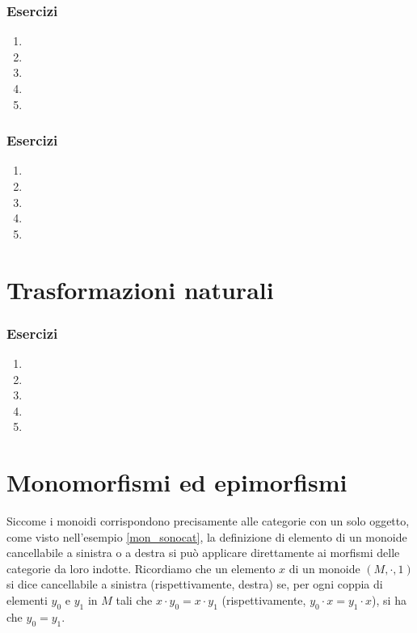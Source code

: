 \subsubsection*{Esercizi}
\begin{enumerate}
	\item
	\item
	\item
	\item
	\item
\end{enumerate}

\subsubsection*{Esercizi}
\begin{enumerate}
	\item
	\item
	\item
	\item
	\item
\end{enumerate}


\section{Trasformazioni naturali}\label{sec_tnat}

\subsubsection*{Esercizi}
\begin{enumerate}
	\item
	\item
	\item
	\item
	\item
\end{enumerate}

\section{Monomorfismi ed epimorfismi}


Siccome i monoidi corrispondono precisamente alle categorie con un solo oggetto, come visto nell'esempio \ref{mon_sonocat},
la definizione di elemento di un monoide cancellabile a sinistra o a destra si può applicare direttamente ai morfismi delle categorie da loro indotte.
Ricordiamo che un elemento \(x\) di un monoide \((M, \cdot, 1)\) si dice cancellabile a sinistra (rispettivamente, destra) se,
per ogni coppia di elementi \(y_0\) e \(y_1\) in \(M\) tali che \(x \cdot y_0 = x \cdot y_1\) (rispettivamente, \(y_0 \cdot x = y_1 \cdot x\)),
si ha che \(y_0 = y_1\).

